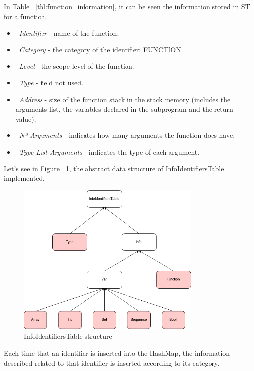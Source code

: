 \documentclass[
  oneside,
  11pt, a4paper,
  footinclude=true,
  headinclude=true,
  cleardoublepage=empty
]{scrbook}
\begin{document}
In Table ~\ref{tbl:function_information}, it can be seen the information stored in ST for a function.
\begin{itemize}
\item ~\textit{Identifier} - name of the function.
\item ~\textit{Category} - the category of the identifier: FUNCTION.
\item ~\textit{Level} - the scope level of the function.
\item ~\textit{Type} - field not used.
\item ~\textit{Address} - size of the function stack in the stack memory (includes the arguments list, the variables declared in the subprogram and the return value).
\item ~\textit{Nº Arguments} - indicates how many arguments the function does have.
\item ~\textit{Type List Arguments} - indicates the type of each argument.
\end{itemize}




Let's see in Figure ~\ref{fig:infoidentifierstable_structure}, the abstract data structure of InfoIdentifiersTable implemented.

\begin{figure}[h!]
  \centering
    \includegraphics[width=0.8\textwidth]{img/InfoIdentifiersTable.png}
    \caption{InfoIdentifiersTable structure}
    \label{fig:infoidentifierstable_structure}
\end{figure}

Each time that an identifier is inserted into the HashMap, the information described related to that identifier is inserted according to its category.
\end{document}
